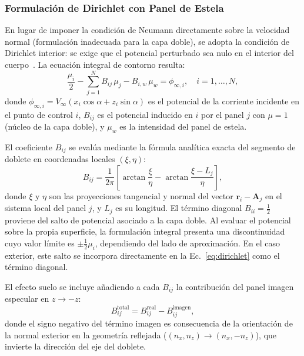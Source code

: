\documentclass[twocolumn]{article}
\begin{document}
\subsubsection{Formulación de Dirichlet con Panel de Estela}

En lugar de imponer la condición de Neumann directamente sobre la
velocidad normal (formulación inadecuada para la capa doble), se
adopta la condición de Dirichlet interior: se exige que el potencial
perturbado sea nulo en el interior del cuerpo~\cite{katz2001}. La
ecuación integral de contorno resulta:
\begin{equation}
  \frac{\mu_i}{2} - \sum_{j=1}^{N} B_{ij}\,\mu_j
  - B_{i,w}\,\mu_w = \phi_{\infty,i},
  \quad i = 1,\ldots,N,
  \label{eq:dirichlet}
\end{equation}
donde $\phi_{\infty,i} = V_\infty(x_i\cos\alpha + z_i\sin\alpha)$
es el potencial de la corriente incidente en el punto de control $i$,
$B_{ij}$ es el potencial inducido en $i$ por el panel $j$ con
$\mu = 1$ (núcleo de la capa doble), y $\mu_w$ es la intensidad del
panel de estela.

El coeficiente $B_{ij}$ se evalúa mediante la fórmula analítica exacta
del segmento de doblete en coordenadas locales $(\xi,\eta)$:
\begin{equation}
  B_{ij} = \frac{1}{2\pi}
  \left[
    \arctan\!\frac{\xi}{{\eta}} -
    \arctan\!\frac{\xi - L_j}{\eta}
  \right],
  \label{eq:Bij}
\end{equation}
donde $\xi$ y $\eta$ son las proyecciones tangencial y normal del vector
$\mathbf{r}_i - \mathbf{A}_j$ en el sistema local del panel $j$,
y $L_j$ es su longitud. El término diagonal \( B_{ii} = \tfrac{1}{2} \) proviene del salto de potencial asociado a la capa doble. Al evaluar el potencial sobre la propia superficie, la formulación integral presenta una discontinuidad cuyo valor límite es \( \pm \tfrac{1}{2}\mu_i \), dependiendo del lado de aproximación. En el caso exterior, este salto se incorpora directamente en la Ec.~\eqref{eq:dirichlet} como el término diagonal.

El efecto suelo se incluye añadiendo a cada $B_{ij}$ la contribución
del panel imagen especular en $z \to -z$:
\begin{equation}
  B_{ij}^\text{total} = B_{ij}^\text{real} - B_{ij}^\text{imagen},
  \label{eq:Bij_total}
\end{equation}
donde el signo negativo del término imagen es consecuencia de la
orientación de la normal exterior en la geometría reflejada
($(n_x, n_z) \to (n_x, -n_z)$), que invierte la dirección del
eje del doblete.
\end{document}
